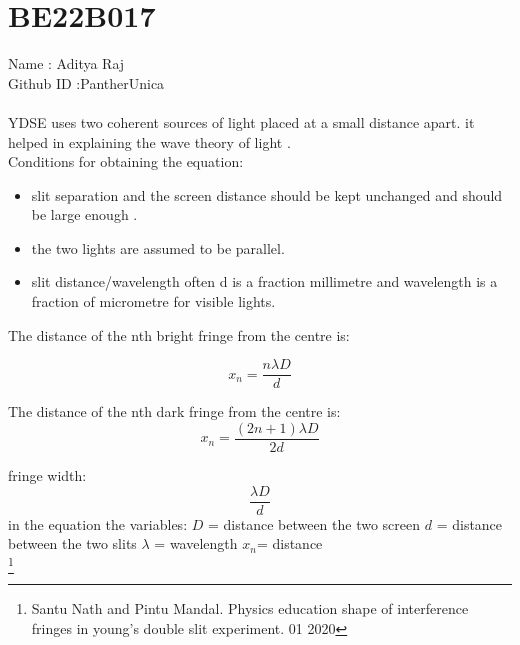 \section{BE22B017}
Name      : Aditya Raj \\
Github ID :PantherUnica\\
\\
YDSE uses two coherent sources of light placed at a small distance apart.
it helped in explaining the wave theory of light .\\

Conditions for obtaining the equation:     
\begin{itemize}
\item slit separation and the screen distance should be kept unchanged and          should be large enough .

\item the two lights are assumed to be parallel.

\item slit distance/wavelength often d is a fraction millimetre and wavelength is a fraction of micrometre for visible lights.
\end{itemize}

The distance of the nth  bright fringe from the centre is:

\begin{equation}
    x_n = \frac{n\lambda D}{d} 
\end{equation}
  
The distance of the nth  dark fringe from the centre is:
\begin{equation}
    x_n =  \frac{(2n+1) \lambda D}{2d} 
\end{equation}

fringe width:
\begin{equation}
    \frac{\lambda D}{d} 
\end{equation}
in the equation the variables:
$D $ = distance between the two screen
$d $ = distance between the two slits 
$ \lambda $ = wavelength 
$x_n $= distance \\
\footnote{
Santu Nath and Pintu Mandal. Physics education shape of interference fringes in young’s double slit experiment. 01 2020
}
